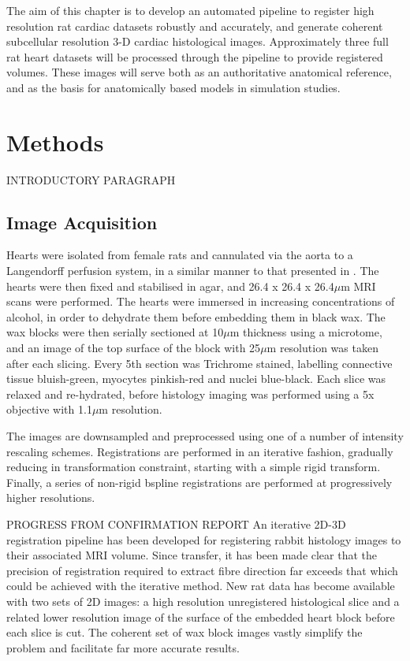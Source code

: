  The aim of this chapter is to develop an automated pipeline to register high resolution rat cardiac datasets robustly and accurately, and generate coherent subcellular resolution 3-D cardiac histological images.  Approximately three full rat heart datasets will be processed through the pipeline to provide registered volumes. These images will serve both as an authoritative anatomical reference, and as the basis for anatomically based models in simulation studies.
  
  

\section{Methods} %
\label{sec:methods}
  INTRODUCTORY PARAGRAPH
  
  \subsection{Image Acquisition} %
  \label{sub:image_acquisition}
    Hearts were isolated from female rats and cannulated via the aorta to a Langendorff perfusion system, in a similar manner to that presented in \cite{Burton:2006p100}. The hearts were then fixed and stabilised in agar, and 26.4 x 26.4 x 26.4$\mu$m MRI scans were performed. The hearts were immersed in increasing concentrations of alcohol, in order to dehydrate them before embedding them in black wax. The wax blocks were then serially sectioned at 10$\mu$m thickness using a microtome, and an image of the top surface of the block with 25$\mu$m resolution was taken after each slicing. Every 5th section was Trichrome stained, labelling connective tissue bluish-green, myocytes pinkish-red and nuclei blue-black. Each slice was relaxed and re-hydrated, before histology imaging was performed using a 5x objective with 1.1$\mu$m resolution.


The images are downsampled and preprocessed using one of a number of intensity rescaling schemes. Registrations are performed in an iterative fashion, gradually reducing in transformation constraint, starting with a simple rigid transform. Finally, a series of non-rigid bspline registrations are performed at progressively higher resolutions.

PROGRESS FROM CONFIRMATION REPORT 
An iterative 2D-3D registration pipeline has been developed for registering rabbit histology images to their associated MRI volume. Since transfer, it has been made clear that the precision of registration required to extract fibre direction far exceeds that which could be achieved with the iterative method. New rat data has become available with two sets of 2D images: a high resolution unregistered histological slice and a related lower resolution image of the surface of the embedded heart block before each slice is cut. The coherent set of wax block images vastly simplify the problem and facilitate far more accurate results.


